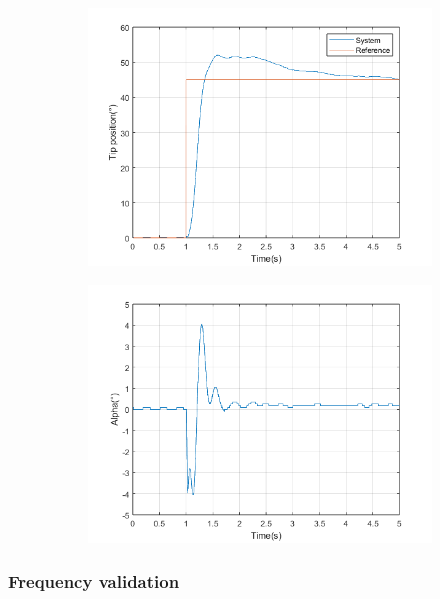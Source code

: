 \begin{figure}[H]
     \centering
     \begin{subfigure}{0.47\textwidth}
         \centering
         \includegraphics[width=\textwidth]{./images/Chapter 4/FB/Step.png}
     \end{subfigure}
     \hfill
     \begin{subfigure}{0.47\textwidth}
         \centering
         \includegraphics[width=\textwidth]{./images/Chapter 4/FB/Alpha.png}
     \end{subfigure}
\end{figure}

\subsubsection{Frequency validation}

